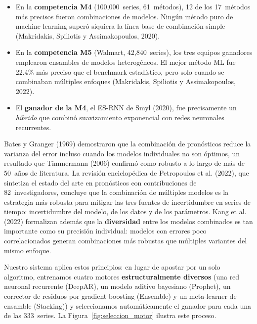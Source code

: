 \documentclass[12pt, letterpaper]{article}
\newcommand{\figref}[1]{Figura~\ref{#1}}
\begin{document}
\begin{itemize}
  \item En la \textbf{competencia M4} (100,000~series, 61~métodos), 12 de los 17~métodos más precisos fueron combinaciones de modelos. Ningún método puro de machine learning superó siquiera la línea base de combinación simple (Makridakis, Spiliotis y Assimakopoulos, 2020).
  \item En la \textbf{competencia M5} (Walmart, 42,840~series), los tres equipos ganadores emplearon ensambles de modelos heterogéneos. El mejor método ML fue 22.4\% más preciso que el benchmark estadístico, pero solo cuando se combinaban múltiples enfoques (Makridakis, Spiliotis y Assimakopoulos, 2022).
  \item El \textbf{ganador de la M4}, el ES-RNN de Smyl (2020), fue precisamente un \textit{híbrido} que combinó suavizamiento exponencial con redes neuronales recurrentes.
\end{itemize}

Bates y Granger (1969) demostraron que la combinación de pronósticos reduce la varianza del error incluso cuando los modelos individuales no son óptimos, un resultado que Timmermann (2006) confirmó como robusto a lo largo de más de 50~años de literatura. La revisión enciclopédica de Petropoulos et al. (2022), que sintetiza el estado del arte en pronósticos con contribuciones de 82~investigadores, concluye que la combinación de múltiples modelos es la estrategia más robusta para mitigar las tres fuentes de incertidumbre en series de tiempo: incertidumbre del modelo, de los datos y de los parámetros. Kang et al. (2022) formalizan además que la \textbf{diversidad} entre los modelos combinados es tan importante como su precisión individual: modelos con errores poco correlacionados generan combinaciones más robustas que múltiples variantes del mismo enfoque.

Nuestro sistema aplica estos principios: en lugar de apostar por un solo algoritmo, entrenamos cuatro motores \textbf{estructuralmente diversos} (una red neuronal recurrente (DeepAR), un modelo aditivo bayesiano (Prophet), un corrector de residuos por gradient boosting (Ensemble) y un meta-learner de ensamble (Stacking)) y seleccionamos automáticamente el ganador para cada una de las 333~series. La \figref{fig:seleccion_motor} ilustra este proceso.
\end{document}
